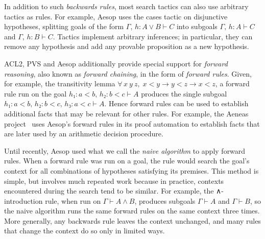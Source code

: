 \documentclass[runningheads,leqno]{llncs}
\newcommand{\All}[2]{\ensuremath{\forall\, #1,\; #2}}
\begin{document}
In addition to such \emph{backwards rules}, most search tactics can also use arbitrary tactics as rules.
For example, Aesop uses the cases tactic on disjunctive hypotheses, splitting goals of the form $Γ,\, h : A ∨ B ⊢ C$ into subgoals $Γ,\, h : A ⊢ C$ and $Γ,\, h : B ⊢ C$.
Tactics implement arbitrary inferences; in particular, they can remove any hypothesis and add any provable proposition as a new hypothesis.

ACL2, PVS and Aesop additionally provide special support for \emph{forward reasoning}, also known as \emph{forward chaining}, in the form of \emph{forward rules}.
Given, for example, the transitivity lemma $\All{x~y~z}{x < y → y < z → x < z}$, a forward rule run on the goal $h₁ : a < b,\, h₂ : b < c ⊢ A$ produces the single subgoal $h₁ : a < b,\, h₂ : b < c,\, h₃ : a < c ⊢ A$.
Hence forward rules can be used to establish additional facts that may be relevant for other rules.
For example, the Aeneas project~\cite{Aeneas} uses Aesop's forward rules in its proof automation to establish facts that are later used by an arithmetic decision procedure.

Until recently, Aesop used what we call the \emph{naive algorithm} to apply forward rules.
When a forward rule was run on a goal, the rule would search the goal's context for all combinations of hypotheses satisfying its premises.
This method is simple, but involves much repeated work because in practice, contexts encountered during the search tend to be similar.
For example, the ∧-introduction rule, when run on $Γ ⊢ A ∧ B$, produces subgoals $Γ ⊢ A$ and $Γ ⊢ B$, so the naive algorithm runs the same forward rules on the same context three times.
More generally, any backwards rule leaves the context unchanged, and many rules that change the context do so only in limited ways.
\end{document}
